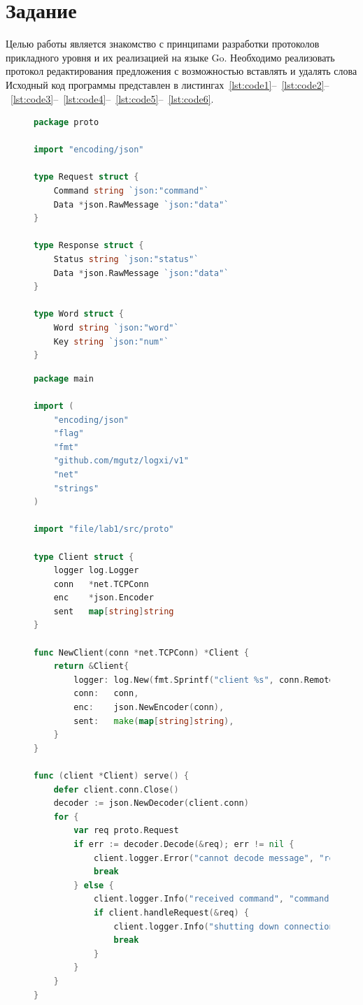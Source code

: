\documentclass[a4paper, 14pt]{extarticle}
\begin{document}
\renewcommand{\ttdefault}{pcr}

\setlength{\tabcolsep}{3pt}
\newpage
\setcounter{page}{2}
\section{Задание}\label{Sect::task}
Целью работы является знакомство с принципами разработки протоколов прикладного уровня и их реализацией на языке Go. 
Необходимо реализовать протокол редактирования предложения с возможностью вставлять и удалять слова
Исходный код программы представлен в листингах~\ref{lst:code1}--~\ref{lst:code2}--~\ref{lst:code3}--~\ref{lst:code4}--~\ref{lst:code5}--~\ref{lst:code6}.

\begin{figure}[!htb]
\begin{lstlisting}[language={Go},caption={proto.go},label={lst:code1}]
package proto

import "encoding/json"

type Request struct {
	Command string `json:"command"`
	Data *json.RawMessage `json:"data"`
}

type Response struct {
	Status string `json:"status"`
	Data *json.RawMessage `json:"data"`
}

type Word struct {
	Word string `json:"word"`
	Key string `json:"num"`
}

\end{lstlisting}
\end{figure}

\newpage

\begin{figure}[!htb]
\begin{lstlisting}[language={Go},caption={server.go},label={lst:code2}]
package main

import (
	"encoding/json"
	"flag"
	"fmt"
	"github.com/mgutz/logxi/v1"
	"net"
	"strings"
)

import "file/lab1/src/proto"

type Client struct {
	logger log.Logger       
	conn   *net.TCPConn      
	enc    *json.Encoder     
	sent   map[string]string 
}

func NewClient(conn *net.TCPConn) *Client {
	return &Client{
		logger: log.New(fmt.Sprintf("client %s", conn.RemoteAddr().String())),
		conn:   conn,
		enc:    json.NewEncoder(conn),
		sent:   make(map[string]string),
	}
}

func (client *Client) serve() {
	defer client.conn.Close()
	decoder := json.NewDecoder(client.conn)
	for {
		var req proto.Request
		if err := decoder.Decode(&req); err != nil {
			client.logger.Error("cannot decode message", "reason", err)
			break
		} else {
			client.logger.Info("received command", "command", req.Command)
			if client.handleRequest(&req) {
				client.logger.Info("shutting down connection")
				break
			}
		}
	}
}


\end{lstlisting}
\end{figure}
\end{document}
